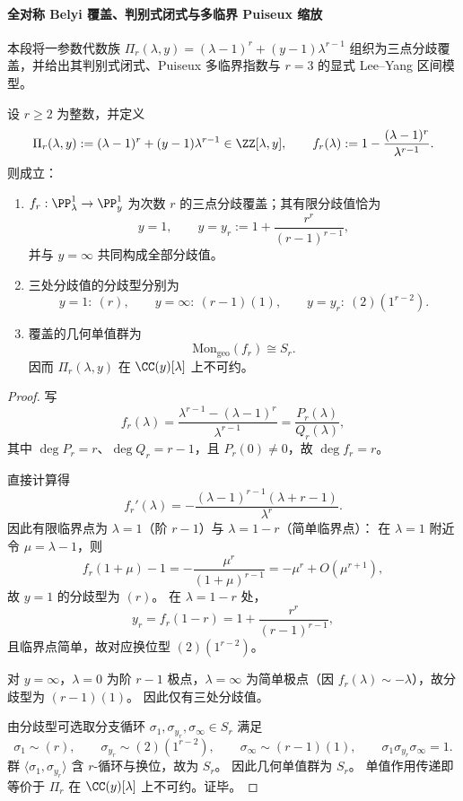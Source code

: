 \paragraph{全对称 Belyi 覆盖、判别式闭式与多临界 Puiseux 缩放}
本段将一参数代数族
\(
\Pi_r(\lambda,y)=(\lambda-1)^r+(y-1)\lambda^{r-1}
\)
组织为三点分歧覆盖，并给出其判别式闭式、Puiseux 多临界指数与 \(r=3\) 的显式 Lee--Yang 区间模型。

\begin{theorem}\label{thm:xi-terminal-belyi-full-symmetric-cover}
设 \(r\ge 2\) 为整数，并定义
\[
\Pi_r(\lambda,y):=(\lambda-1)^r+(y-1)\lambda^{r-1}\in\ZZ[\lambda,y],
\qquad
f_r(\lambda):=1-\frac{(\lambda-1)^r}{\lambda^{r-1}}.
\]
则成立：
\begin{enumerate}
  \item \(f_r:\PP^1_\lambda\to\PP^1_y\) 为次数 \(r\) 的三点分歧覆盖；其有限分歧值恰为
  \[
  y=1,\qquad y=y_r:=1+\frac{r^r}{(r-1)^{r-1}},
  \]
  并与 \(y=\infty\) 共同构成全部分歧值。
  \item 三处分歧值的分歧型分别为
  \[
  y=1:\ (r),\qquad
  y=\infty:\ (r-1)(1),\qquad
  y=y_r:\ (2)(1^{r-2}).
  \]
  \item 覆盖的几何单值群为
  \[
  \mathrm{Mon}_{\mathrm{geo}}(f_r)\cong S_r.
  \]
  因而 \(\Pi_r(\lambda,y)\) 在 \(\CC(y)[\lambda]\) 上不可约。
\end{enumerate}
\end{theorem}
\begin{proof}
写
\[
f_r(\lambda)=\frac{\lambda^{r-1}-(\lambda-1)^r}{\lambda^{r-1}}=\frac{P_r(\lambda)}{Q_r(\lambda)},
\]
其中 \(\deg P_r=r\)、\(\deg Q_r=r-1\)，且 \(P_r(0)\neq 0\)，故 \(\deg f_r=r\)。

直接计算得
\[
f_r'(\lambda)=-\frac{(\lambda-1)^{r-1}(\lambda+r-1)}{\lambda^r}.
\]
因此有限临界点为 \(\lambda=1\)（阶 \(r-1\)）与 \(\lambda=1-r\)（简单临界点）：
在 \(\lambda=1\) 附近令 \(\mu=\lambda-1\)，则
\[
f_r(1+\mu)-1=-\frac{\mu^r}{(1+\mu)^{r-1}}=-\mu^r+O(\mu^{r+1}),
\]
故 \(y=1\) 的分歧型为 \((r)\)。
在 \(\lambda=1-r\) 处，
\[
y_r=f_r(1-r)=1+\frac{r^r}{(r-1)^{r-1}},
\]
且临界点简单，故对应换位型 \((2)(1^{r-2})\)。

对 \(y=\infty\)，\(\lambda=0\) 为阶 \(r-1\) 极点，\(\lambda=\infty\) 为简单极点（因 \(f_r(\lambda)\sim-\lambda\)），故分歧型为 \((r-1)(1)\)。
因此仅有三处分歧值。

由分歧型可选取分支循环 \(\sigma_1,\sigma_{y_r},\sigma_\infty\in S_r\) 满足
\[
\sigma_1\sim (r),\qquad
\sigma_{y_r}\sim (2)(1^{r-2}),\qquad
\sigma_\infty\sim (r-1)(1),\qquad
\sigma_1\sigma_{y_r}\sigma_\infty=1.
\]
群 \(\langle \sigma_1,\sigma_{y_r}\rangle\) 含 \(r\)-循环与换位，故为 \(S_r\)。
因此几何单值群为 \(S_r\)。
单值作用传递即等价于 \(\Pi_r\) 在 \(\CC(y)[\lambda]\) 上不可约。证毕。
\end{proof}

